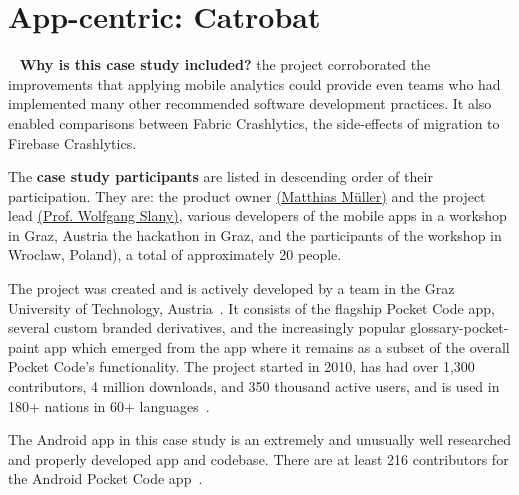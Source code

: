 \section{App-centric: Catrobat}~\label{case-study-overview-catrobat}
\textbf{Why is this case study included?} the project corroborated the improvements that applying mobile analytics could provide even teams who had implemented many other recommended software development practices. It also enabled comparisons between Fabric Crashlytics, the side-effects of migration to Firebase Crashlytics.
    
The \textbf{case study participants} are listed in descending order of their participation. They are: the product owner \href{https://scholar.google.com/citations?user=IL9T0Y0AAAAJ&hl=en}{(Matthias Müller)} and the project lead \href{http://www.ist.tugraz.at/wolfgang_slany.html}{(Prof. Wolfgang Slany)}, various developers of the mobile apps in a workshop in Graz, Austria the hackathon in Graz, and the participants of the workshop in Wroclaw, Poland), a total of approximately 20 people.

The  project was created and is actively developed by a team in the Graz University of Technology, Austria~. It consists of the flagship Pocket Code app, several custom branded derivatives, and the increasingly popular \Gls{glossary-pocket-paint} app which emerged from the  app where it remains as a subset of the overall Pocket Code's functionality. The project started in 2010, has had over 1,300 contributors, 4 million downloads, and 350 thousand active users, and is used in 180+ nations in 60+ languages~.

The Android app in this case study is an extremely and unusually well researched and properly developed app and codebase.  There are at least 216 contributors for the Android Pocket Code app~.

